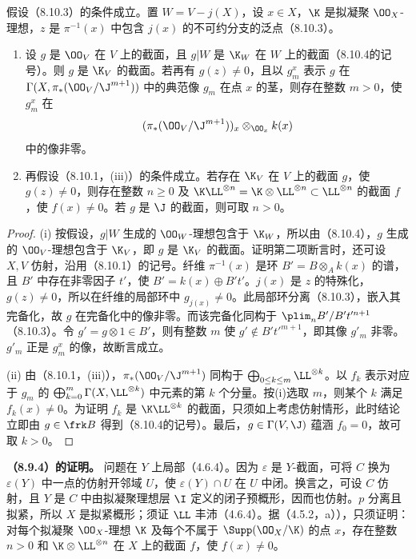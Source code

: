  假设（8.10.3）的条件成立。置 $W=V-j(X)$，设 $x\in X$，$\K$ 是拟凝聚 $\OO_X$-理想，$z$ 是 $\pi^{-1}(x)$ 中包含 $j(x)$ 的不可约分支的泛点（8.10.3）。
\begin{enumerate}[label=(\roman*)]
\item 设 $g$ 是 $\OO_V$ 在 $V$ 上的截面，且 $g|W$ 是 $\K_W$ 在 $W$ 上的截面（8.10.4的记号）。则 $g$ 是 $\K_V$ 的截面。若再有 $g(z)\ne0$，且以 $g_m^x$ 表示 $g$ 在 $\Gamma(X,\pi_*(\OO_V/\J^{m+1}))$ 中的典范像 $g_m$ 在点 $x$ 的茎，则存在整数 $m>0$，使 $g_m^x$ 在
\[(\pi_*(\OO_V/\J^{m+1}))_x\otimes_{\OO_x}k(x)\]
中的像非零。
\item 再假设（8.10.1，(iii)）的条件成立。若存在 $\K_V$ 在 $V$ 上的截面 $g$，使 $g(z)\ne0$，则存在整数 $n\geq0$ 及 $\K\LL^{\otimes n}=\K\otimes\LL^{\otimes n}\subset\LL^{\otimes n}$ 的截面 $f$，使 $f(x)\ne0$。若 $g$ 是 $\J$ 的截面，则可取 $n>0$。
\end{enumerate}
\begin{proof}
(i) 按假设，$g|W$ 生成的 $\OO_W$-理想包含于 $\K_W$，所以由（8.10.4），$g$ 生成的 $\OO_V$-理想包含于 $\K_V$，即 $g$ 是 $\K_V$ 的截面。证明第二项断言时，还可设 $X,V$ 仿射，沿用（8.10.1）的记号。纤维 $\pi^{-1}(x)$ 是环 $B'=B\otimes_A k(x)$ 的谱，且 $B'$ 中存在非零因子 $t'$，使 $B'=k(x)\oplus B't'$。$j(x)$ 是 $z$ 的特殊化，$g(z)\ne0$，所以在纤维的局部环中 $g_{j(x)}\ne0$。此局部环分离（8.10.3），嵌入其完备化，故 $g$ 在完备化中的像非零。而该完备化同构于 $\plim_n B'/B't'^{n+1}$（8.10.3）。令 $g'=g\otimes1\in B'$，则有整数 $m$ 使 $g'\notin B't'^{m+1}$，即其像 $g'_m$ 非零。$g'_m$ 正是 $g_m^x$ 的像，故断言成立。

(ii) 由（8.10.1，(iii)），$\pi_*(\OO_V/\J^{m+1})$ 同构于 $\bigoplus_{0\leq k\leq m}\LL^{\otimes k}$。以 $f_k$ 表示对应于 $g_m$ 的 $\bigoplus_{k=0}^m\Gamma(X,\LL^{\otimes k})$ 中元素的第 $k$ 个分量。按(i)选取 $m$，则某个 $k$ 满足 $f_k(x)\ne0$。为证明 $f_k$ 是 $\K\LL^{\otimes k}$ 的截面，只须如上考虑仿射情形，此时结论立即由 $g\in\frk B$ 得到（8.10.4的记号）。最后，$g\in\Gamma(V,\J)$ 蕴涵 $f_0=0$，故可取 $k>0$。
\end{proof}

 \textbf{（8.9.4）的证明。} 问题在 $Y$ 上局部（4.6.4）。因为 $\varepsilon$ 是 $Y$-截面，可将 $C$ 换为 $\varepsilon(Y)$ 中一点的仿射开邻域 $U$，使 $\varepsilon(Y)\cap U$ 在 $U$ 中闭。换言之，可设 $C$ 仿射，且 $Y$ 是 $C$ 中由拟凝聚理想层 $\I$ 定义的闭子预概形，因而也仿射。$p$ 分离且拟紧，所以 $X$ 是拟紧概形；须证 $\LL$ 丰沛（4.6.4）。据（4.5.2，a）），只须证明：对每个拟凝聚 $\OO_X$-理想 $\K$ 及每个不属于 $\Supp(\OO_X/\K)$ 的点 $x$，存在整数 $n>0$ 和 $\K\otimes\LL^{\otimes n}$ 在 $X$ 上的截面 $f$，使 $f(x)\ne0$。

